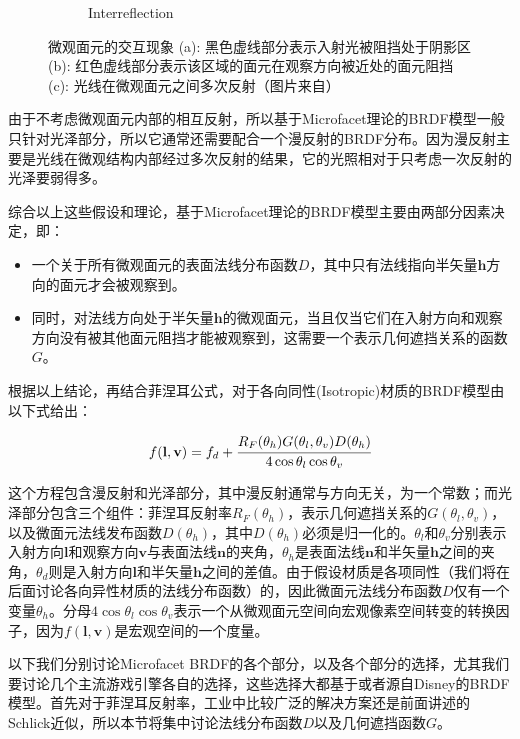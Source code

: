 \begin{figure}
\begin{subfigure}[b]{0.283\textwidth}
		\caption{Interreflection}
	\end{subfigure}
\caption{微观面元的交互现象 (a): 黑色虚线部分表示入射光被阻挡处于阴影区 (b): 红色虚线部分表示该区域的面元在观察方向被近处的面元阻挡 (c): 光线在微观面元之间多次反射（图片来自\cite{b:rtr}）}
\label{f:intro-microfacet-effect}
\end{figure}

由于不考虑微观面元内部的相互反射，所以基于Microfacet理论的BRDF模型一般只针对光泽部分，所以它通常还需要配合一个漫反射的BRDF分布。因为漫反射主要是光线在微观结构内部经过多次反射的结果，它的光照相对于只考虑一次反射的光泽要弱得多。


综合以上这些假设和理论，基于Microfacet理论的BRDF模型主要由两部分因素决定，即：

\begin{itemize}
	\item 一个关于所有微观面元的表面法线分布函数$D$，其中只有法线指向半矢量$\mathbf{h}$方向的面元才会被观察到。
	\item 同时，对法线方向处于半矢量$\mathbf{h}$的微观面元，当且仅当它们在入射方向和观察方向没有被其他面元阻挡才能被观察到，这需要一个表示几何遮挡关系的函数$G$。
\end{itemize}

根据以上结论，再结合菲涅耳公式，对于各向同性(Isotropic)材质的BRDF模型由以下式给出：

\begin{equation}
	f(\mathbf{l},\mathbf{v})=f_d+ \cfrac{R_F(\theta_h)G(\theta_l,\theta_v)D(\theta_h)}{4\cos\theta_l \cos\theta_v}
\end{equation}

\noindent 这个方程包含漫反射和光泽部分，其中漫反射通常与方向无关，为一个常数；而光泽部分包含三个组件：菲涅耳反射率$R_F(\theta_h)$，表示几何遮挡关系的$G(\theta_l,\theta_v)$，以及微面元法线发布函数$D(\theta_h)$，其中$D(\theta_h)$必须是归一化的。$\theta_l$和$\theta_v$分别表示入射方向$\mathbf{l}$和观察方向$\mathbf{v}$与表面法线$\mathbf{n}$的夹角，$\theta_h$是表面法线$\mathbf{n}$和半矢量$\mathbf{h}$之间的夹角，$\theta_d$则是入射方向$\mathbf{l}$和半矢量$\mathbf{h}$之间的差值。由于假设材质是各项同性（我们将在后面讨论各向异性材质的法线分布函数）的，因此微面元法线分布函数$D$仅有一个变量$\theta_h$。分母$4\cos\theta_l \cos\theta_v$表示一个从微观面元空间向宏观像素空间转变的转换因子，因为$f(\mathbf{l},\mathbf{v})$是宏观空间的一个度量。


以下我们分别讨论Microfacet BRDF的各个部分，以及各个部分的选择，尤其我们要讨论几个主流游戏引擎各自的选择，这些选择大都基于或者源自Disney\cite{a:PhysicallyBasedShadingatDisney}的BRDF模型。首先对于菲涅耳反射率，工业中比较广泛的解决方案还是前面讲述的Schlick近似，所以本节将集中讨论法线分布函数$D$以及几何遮挡函数$G$。



